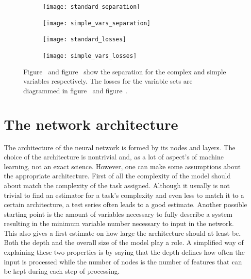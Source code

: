 \begin{figure}[htbp]
    \centering
    \begin{subfigure}[b]{0.45\textwidth}
        \texttt{[image: standard\_separation]}
        \caption{}
        \label{fig:vars:standard:sep}
    \end{subfigure}
\quad
    \begin{subfigure}[b]{0.45\textwidth}
        \texttt{[image: simple\_vars\_separation]}
        \caption{}
        \label{fig:vars:simple:sep}
    \end{subfigure}

    \begin{subfigure}[b]{0.45\textwidth}
		\texttt{[image: standard\_losses]}
		\caption{}
		\label{fig:vars:standard:loss}
	\end{subfigure}
\quad
	\begin{subfigure}[b]{0.45\textwidth}
		\texttt{[image: simple\_vars\_losses]}
		\caption{}
		\label{fig:vars:simple:loss}
	\end{subfigure}
    \caption[Performance of the classifier using different variables]{Figure~ and figure~ show the separation for the complex and simple variables respectively. The losses for the variable sets are diagrammed in figure~ and figure~.}
	\label{fig:vars}
\end{figure}





\section{The network architecture}

The architecture of the neural network is formed by its nodes and layers. The choice of the architecture is nontrivial and, as a lot of aspect's of machine learning, not an exact science.
However, one can make some assumptions about the appropriate architecture.
First of all the complexity of the model should about match the complexity of the task assigned. Although it usually is not trivial to find an estimator for a task's complexity and even less to match it to a certain architecture, a test series often leads to a good estimate. Another possible starting point is the amount of variables necessary to fully describe a system resulting in the minimum variable number necessary to input in the network. This also gives a first estimate on how large the architecture should at least be.
Both the depth and the overall size of the model play a role. A simplified way of explaining these two properties is by saying that the depth defines how often the input is processed while the number of nodes is the number of features that can be kept during each step of processing.

